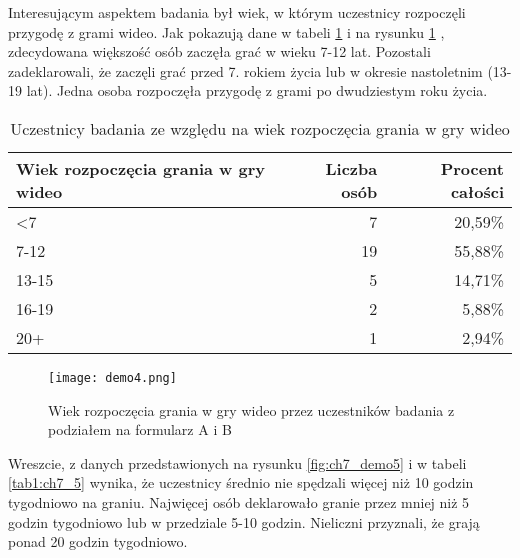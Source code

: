 \newpage

Interesującym aspektem badania był wiek, w którym uczestnicy rozpoczęli przygodę z grami wideo. Jak
pokazują dane w tabeli \ref{tab1:ch7_4}  i na rysunku \ref{fig:ch7_demo4} , zdecydowana większość osób
zaczęła grać w wieku 7-12 lat. Pozostali zadeklarowali, że zaczęli grać przed 7. rokiem życia
lub w okresie nastoletnim (13-19 lat). Jedna osoba rozpoczęła przygodę z grami po dwudziestym roku życia.

\begin{table}[h!]
    \begin{center}
        \begin{tabular}{|l|r|r|}
            \hline
            Wiek rozpoczęcia grania w gry wideo & Liczba osób & Procent całości \\
            \hline
            <7                                  & 7           & 20,59\%         \\
            7-12                                & 19          & 55,88\%         \\
            13-15                               & 5           & 14,71\%         \\
            16-19                               & 2           & 5,88\%          \\
            20+                                 & 1           & 2,94\%          \\
            \hline
        \end{tabular}
    \end{center}
    \caption{Uczestnicy badania ze względu na wiek rozpoczęcia grania w gry wideo}\label{tab1:ch7_4}
\end{table}

\begin{figure}[h!]
    \centering
    \texttt{[image: demo4.png]}
    \caption{Wiek rozpoczęcia grania w gry wideo przez uczestników badania z podziałem na formularz A i B}
    \label{fig:ch7_demo4}
\end{figure}

\newpage

Wreszcie, z danych przedstawionych na rysunku \ref{fig:ch7_demo5} i w tabeli \ref{tab1:ch7_5} wynika, że uczestnicy średnio nie spędzali
więcej niż 10 godzin tygodniowo na graniu. Najwięcej osób deklarowało granie przez mniej niż 5 godzin
tygodniowo lub w przedziale 5-10 godzin. Nieliczni przyznali, że grają ponad 20 godzin tygodniowo.

